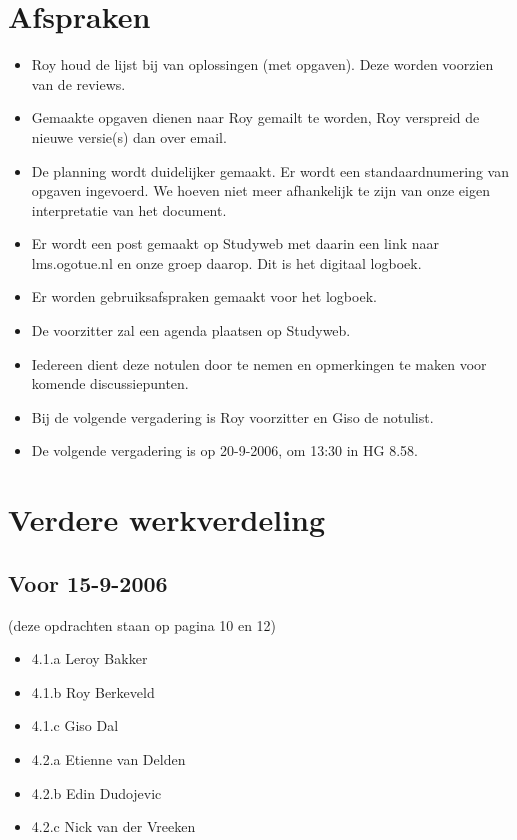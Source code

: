 \documentclass{article}
\begin{document}
\section{Afspraken}

\begin{itemize}
\item Roy houd de lijst bij van oplossingen (met opgaven). Deze worden
voorzien van de reviews.

\item Gemaakte opgaven dienen naar Roy gemailt te worden, Roy verspreid de
nieuwe versie(s) dan over email.

\item De planning wordt duidelijker gemaakt. Er wordt een
standaardnumering van opgaven ingevoerd. We hoeven niet meer
afhankelijk te zijn van onze eigen interpretatie van het document.

\item Er wordt een post gemaakt op Studyweb met daarin een link naar
lms.ogotue.nl en onze groep daarop. Dit is het digitaal logboek.

\item Er worden gebruiksafspraken gemaakt voor het logboek.

\item De voorzitter zal een agenda plaatsen op Studyweb.

\item Iedereen dient deze notulen door te nemen en opmerkingen te
maken voor komende discussiepunten.

\item Bij de volgende vergadering is Roy voorzitter en Giso de notulist.

\item De volgende vergadering is op 20-9-2006, om 13:30 in HG 8.58.
\end{itemize}

\section{Verdere werkverdeling}

\subsection{Voor 15-9-2006}
(deze opdrachten staan op pagina 10 en 12)

\begin{itemize}
\item 4.1.a Leroy Bakker
\item 4.1.b Roy Berkeveld
\item 4.1.c Giso Dal
\item 4.2.a Etienne van Delden
\item 4.2.b Edin Dudojevic
\item 4.2.c Nick van der Vreeken
\end{itemize}
\end{document}
